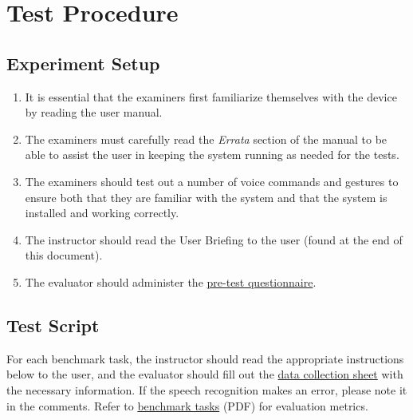\documentclass[12pt,letterpaper]{article}
\begin{document}
\section{Test Procedure}

\subsection{Experiment Setup}

\begin{enumerate}
\item It is essential that the examiners first familiarize themselves with the device by reading the user manual.
\item The examiners must carefully read the \textit{Errata} section of the manual to be able to assist the user in keeping the system running as needed for the tests.
\item The examiners should test out a number of voice commands and gestures to ensure both that they are familiar with the system and that the system is installed and working correctly.
\item The instructor should read the User Briefing to the user (found at the end of this document).
\item The evaluator should administer the \href{http://fluidsurveys.com/s/hciplayer-pretest/}{pre-test questionnaire}.
\end{enumerate}

\subsection{Test Script}

For each benchmark task, the instructor should read the appropriate instructions below to the user, and the evaluator should fill out the \href{http://fluidsurveys.com/s/hciplayer-datacollectionsheet/}{data collection sheet} with the necessary information. If the speech recognition makes an error, please note it in the comments. Refer to \href{http://www.ece.mcgill.ca/~scormi3/hci/docs/benchmark-tasks.pdf}{benchmark tasks} (PDF) for evaluation metrics.
\end{document}

